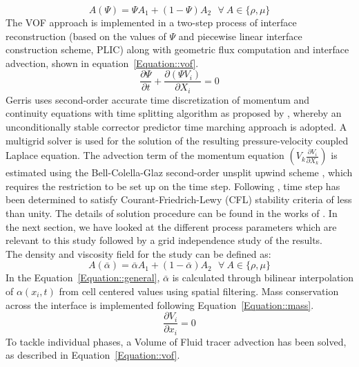 \begin{equation} \label{Equation::general}
A (\Psi) = \Psi A_1 + (1-\Psi)A_2 \: \: \:  \forall  \: A \in \{\rho, \mu\}
\end{equation}
The VOF approach is implemented in a two-step process of interface reconstruction (based on the values of $\Psi$ and piecewise linear interface construction scheme, PLIC) along with geometric flux computation and interface advection, shown in equation~\ref{Equation::vof}.
\begin{equation} \label{Equation::vof}
\frac{\partial \Psi}{\partial t} + \frac{\partial(\Psi V_i)}{\partial X_i} = 0
\end{equation}
Gerris uses second-order accurate time discretization of momentum and continuity equations with time splitting algorithm as proposed by \cite{Chorin1968}, whereby an unconditionally stable corrector predictor time marching approach is adopted. A multigrid solver is used for the solution of the resulting pressure-velocity coupled Laplace equation. The advection term of the momentum equation $\left(V_k\frac{\partial V_i}{\partial X_k}\right)$ is estimated using the Bell-Colella-Glaz second-order unsplit upwind scheme \citep{bell1989second}, which requires the restriction to be set up on the time step. Following \cite{popinet2009}, time step has been determined to satisfy Courant-Friedrich-Lewy (CFL) stability criteria of less than unity. The details of solution procedure can be found in the works of \cite{Popinet2003,popinet2009}. In the next section, we have looked at the different process parameters which are relevant to this study followed by a grid independence study of the results.\\
 The density and viscosity field for the study can be defined as:
\begin{equation} \label{Equation::general}
A (\bar{\alpha}) = \bar{\alpha}A_1 + (1-\bar{\alpha})A_2 \: \: \:  \forall  \: A \in \{\rho, \mu\}
\end{equation}
In the Equation~\ref{Equation::general}, $\bar{\alpha}$ is calculated through bilinear interpolation of $\alpha(x_i,t)$ from cell centered values using spatial filtering. Mass conservation across the interface is implemented following Equation~\ref{Equation::mass}. 
\begin{equation} \label{Equation::mass}
\frac{\partial V_i}{\partial x_i} = 0
\end{equation}
 To tackle individual phases, a Volume of Fluid tracer advection has been solved, as described in Equation~\ref{Equation::vof}. 
